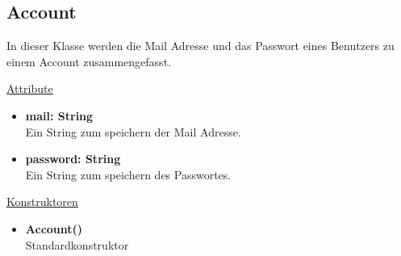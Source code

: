 \newpage
\subsection{Account}\label{Account}
In dieser Klasse werden die Mail Adresse und das Passwort eines Benutzers zu einem Account zusammengefasst. \newline

\underline{Attribute}
\begin{itemize}
\itemsep0pt
\item \textbf{mail: String} \hfill\\ 
Ein String zum speichern der Mail Adresse.

\item \textbf{password: String} \hfill\\ 
Ein String zum speichern des Passwortes.

\end{itemize}

\underline{Konstruktoren}
\begin{itemize}
\itemsep0pt
\item \textbf{Account()} \hfill\\
Standardkonstruktor
\end{itemize}
